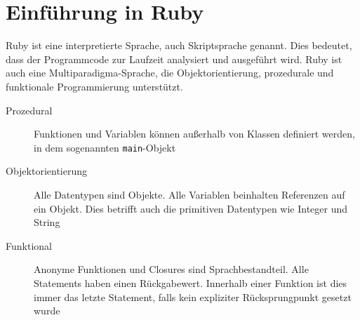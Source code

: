 \section{Einführung in Ruby}
Ruby ist eine interpretierte Sprache, auch Skriptsprache genannt. Dies bedeutet, dass der Programmcode zur Laufzeit analysiert und ausgeführt wird. Ruby ist auch eine Multiparadigma-Sprache, die Objektorientierung, prozedurale und funktionale Programmierung unterstützt.
\begin{description}
 \item[Prozedural] Funktionen und Variablen können außerhalb von Klassen definiert werden, in dem sogenannten \texttt{main}-Objekt
 \item[Objektorientierung] Alle Datentypen sind Objekte. Alle Variablen beinhalten Referenzen auf ein Objekt. Dies betrifft auch die primitiven Datentypen wie Integer und String
 \item[Funktional] Anonyme Funktionen und Closures sind Sprachbestandteil. Alle Statements haben einen Rückgabewert. Innerhalb einer Funktion ist dies immer das letzte Statement, falls kein expliziter Rücksprungpunkt gesetzt wurde
\end{description}


